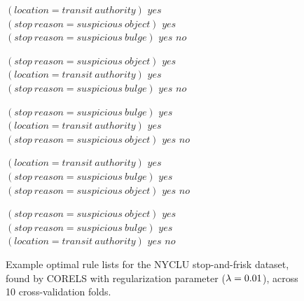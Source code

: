 \begin{figure}[h!]
\begin{algorithmic}
\State \bif $(location = transit~authority)$ \bthen $yes$ 
\State \belif $(stop~reason = suspicious~object)$ \bthen $yes$
\State \belif $(stop~reason = suspicious~bulge)$ \bthen $yes$
\State \belse $no$
\end{algorithmic}
\vspace{1mm}
\begin{algorithmic}
\State \bif $(stop~reason = suspicious~object)$ \bthen $yes$ 
\State \belif $(location = transit~authority)$ \bthen $yes$
\State \belif $(stop~reason = suspicious~bulge)$ \bthen $yes$
\State \belse $no$
\end{algorithmic}
\vspace{1mm}
\begin{algorithmic}
\State \bif $(stop~reason = suspicious~bulge)$ \bthen $yes$ 
\State \belif $(location = transit~authority)$ \bthen $yes$
\State \belif $(stop~reason = suspicious~object)$ \bthen $yes$
\State \belse $no$
\end{algorithmic}
\vspace{1mm}
\begin{algorithmic}
\State \bif $(location = transit~authority)$ \bthen $yes$ 
\State \belif $(stop~reason = suspicious~bulge)$ \bthen $yes$
\State \belif $(stop~reason = suspicious~object)$ \bthen $yes$
\State \belse $no$
\end{algorithmic}
\vspace{1mm}
\begin{algorithmic}
\State \bif $(stop~reason = suspicious~object)$ \bthen $yes$ 
\State \belif $(stop~reason = suspicious~bulge)$ \bthen $yes$
\State \belif $(location = transit~authority)$ \bthen $yes$
\State \belse $no$
\end{algorithmic}
\caption{Example optimal rule lists for the NYCLU stop-and-frisk dataset,
found by CORELS with regularization parameter (${\lambda} = 0.01$), across 10 cross-validation folds.
}
\label{fig:weapon-rule-list-01}
\end{figure}


